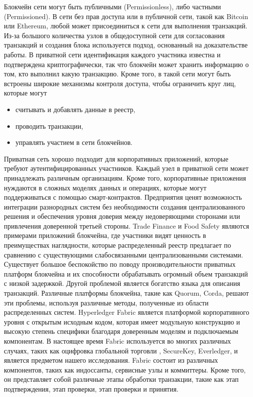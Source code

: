 Блокчейн сети могут быть публичными (Permissionless), либо частными (Permissioned). В сети без прав доступа или в публичной сети, такой как Bitcoin или Ethereum, любой может присоединиться к сети для выполнения транзакций. Из-за большого количества узлов в общедоступной сети для согласования транзак­ций и создания блока используется подход, основанный на доказательстве работы. В приватной сети идентификация каждого участника известна и подтверждена криптографически, так что блокчейн может хранить информацию о том, кто выполнил какую транзакцию. Кроме того, в такой сети могут быть встроены ши­рокие механизмы контроля доступа, чтобы ограничить круг лиц, которые могут
\begin{itemize}
	\item считывать и добавлять данные в реестр,
	\item проводить транзакции,
	\item управлять участием в сети блокчейнов.
\end{itemize}
Приватная сеть хорошо подходит для корпоративных приложений, которые требуют аутентифицированных участников. Каждый узел в приватной сети может принадлежать различным организациям. Кроме того, корпоративные приложения нуждаются в сложных моделях данных и операциях, которые могут поддерживаться с помощью смарт-контрактов. Предприятия ценят возможность интеграции разнородных систем без необходимости создания централизованного решения и обеспечения уровня доверия между недоверяющими сторонами или привлечения доверенной третьей стороны. Trade Finance и Food Safety являются примерами приложений блокчейна, где участники видят ценность в преимуществах наглядности, которые распределенный реестр предлагает по сравнению с существующими слабосвязанными централизованными системами. Существует большое беспокойство по поводу производительности приватных платформ блокчейна и их способности обрабатывать огромный объем транзакций с низкой задержкой. Другой проблемой является богатство языка для описания транзакций. Различные платформы блокчейна, такие как Quorum, Corda, решают эти проблемы, используя различные методы, полученные из области распределенных систем. Hyperledger Fabric является платформой корпоративного уровня с открытым исходным кодом, которая имеет модульную конструкцию и высокую степень специфики благодаря доверенным моделям и подключаемым компонентам. В настоящее время Fabric используется во многих различных случаях, таких как оцифровка глобальной торговли , SecureKey, Everledger, и является предметом нашего исследования. Fabric состоит из различных компонентов, таких как индоссанты, сервисные узлы и коммиттеры. Кроме того, он представляет собой различные этапы обработки транзакции, такие как этап подтверждения, этап проверки, этап проверки и принятия.

